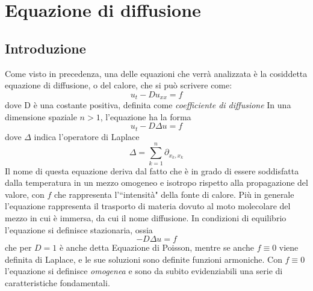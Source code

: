 \documentclass[a4paper,12pt, draft]{article}
\theoremstyle{break}
\numberwithin{equation}{section}
\begin{document}
\section{Equazione di diffusione}
\subsection{Introduzione}
Come visto in precedenza, una delle equazioni che verrà analizzata è la cosiddetta equazione di diffusione, o del calore, che si può scrivere come:
\begin{equation}
u_t - D u_{xx} = f
\end{equation}
dove D è una costante positiva, definita come \textit{coefficiente di diffusione}
In una dimensione spaziale $n>1$, l'equazione ha la forma\begin{equation}
u_t - D \Delta u = f
\end{equation}
dove $\Delta$ indica l'operatore di Laplace
$$\Delta = \sum_{k=1}^n \partial_{x_k, x_k}$$
Il nome di questa equazione deriva dal fatto che è in grado di essere soddisfatta dalla temperatura in un mezzo omogeneo e isotropo rispetto alla propagazione del valore, con $f$ che rappresenta l'``intensità" della fonte di calore.  
Più in generale l'equazione rappresenta il trasporto di materia dovuto al moto molecolare del mezzo in cui è immersa, da cui il nome diffusione.
In condizioni di equilibrio l'equazione si definisce stazionaria, ossia
\begin{equation}
-D\Delta u = f
\end{equation}
che per $D=1$ è anche detta Equazione di Poisson, mentre se anche $f \equiv 0$ viene definita di Laplace, e le sue soluzioni sono definite funzioni armoniche. Con $f \equiv 0$ l'equazione si definisce \textit{omogenea} e sono da subito evidenziabili una serie di caratteristiche fondamentali.
\end{document}
